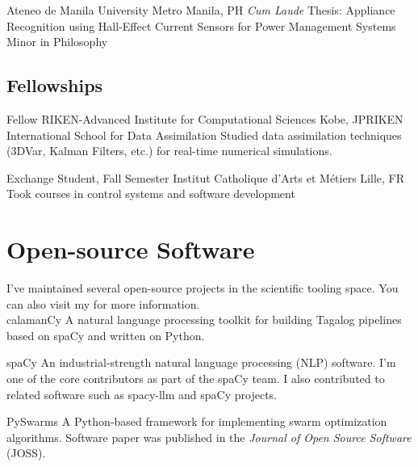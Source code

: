 \documentclass[12pt,a4paper]{moderncv}
\begin{document}
{Ateneo de Manila University}
{Metro Manila, PH}
{\textit{Cum Laude}}
{
    Thesis: Appliance Recognition using Hall-Effect Current Sensors for
    Power Management Systems\\
    Minor in Philosophy
}
\vspace{0.5em}


\subsection{Fellowships}

{Fellow}
{RIKEN-Advanced Institute for Computational Sciences}
{Kobe, JP}{RIKEN International School for Data Assimilation}
{Studied data assimilation techniques (3DVar, Kalman Filters, etc.) for real-time numerical simulations.}
\vspace{0.5em}

{Exchange Student, Fall Semester}
{Institut Catholique d'Arts et M\'etiers}
{Lille, FR}{}
{Took courses in control systems and software development}

\section{Open-source Software}

I've maintained several open-source projects in the scientific tooling space.
You can also visit my {\color{blue}} for more information.\\


{\color{blue}
    }
{calamanCy}{}{}
{
    A natural language processing toolkit for building Tagalog pipelines based on spaCy and written on Python.
}

{\color{blue}
    }
{spaCy}{}{}
{
    An industrial-strength natural language processing (NLP) software.
    I'm one of the core contributors as part of the spaCy team.
    I also contributed to related software such as spacy-llm and spaCy projects.
}

{\color{blue} }
{PySwarms}{}{}
{
    A Python-based framework for implementing swarm optimization
    algorithms. Software paper was published in the \textit{Journal of Open
        Source Software} (JOSS).
}
\end{document}
